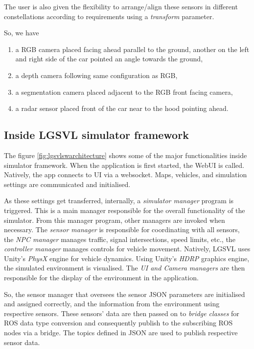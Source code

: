 The user is also given the flexibility to arrange/align these sensors in different constellations according to
requirements using a \textit{transform} parameter.

So, we have

\begin{enumerate}

    \item a RGB camera placed facing ahead parallel to the ground, another on
the left and right side of the car pointed an angle towards the ground,
    \item a depth camera following same configuration as RGB,
    \item a segmentation camera placed adjacent to the RGB front facing camera,
    \item a radar sensor placed front of the car near to the hood pointing ahead.
\end{enumerate}

\subsection{Inside LGSVL simulator framework}
The figure \ref{fig:lgsvlswarchitecture} shows some of the major functionalities inside
simulator framework. When the application is first started, the WebUI is called. Natively,
the app connects to UI via a websocket. Maps, vehicles, and simulation settings are
communicated and initialised.

As these settings get transferred, internally, a \textit{simulator manager} program is
triggered. This is a main manager responsible for the overall functionality of the
simulator. From this manager program, other managers are invoked when necessary. The
\textit{sensor manager} is responsible for coordinating with all sensors, the \textit{NPC
manager} manages traffic, signal intersections, speed limits, etc., the \textit{controller
manager} manages controls for vehicle movement. Natively, LGSVL uses Unity's \textit{PhysX} engine
for vehicle dynamics. Using Unity's \textit{HDRP} graphics engine, the simulated environment is visualised. The
\textit{UI and Camera managers} are then responsible for the display of the environment in
the application.

So, the sensor manager that oversees the sensor JSON parameters are initialised and assigned correctly, and the
information from the environment using respective sensors. These sensors' data are then
passed on to \textit{bridge classes} for ROS data type conversion and consequently publish
to the subscribing ROS nodes via a bridge. The topics defined in JSON are used to publish
respective sensor data.

